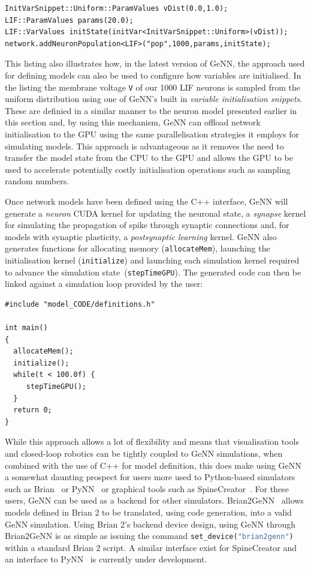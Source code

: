 \documentclass[utf8]{frontiersSCNS} %
\begin{document}
%
\begin{lstlisting}
InitVarSnippet::Uniform::ParamValues vDist(0.0,1.0);
LIF::ParamValues params(20.0);
LIF::VarValues initState(initVar<InitVarSnippet::Uniform>(vDist));
network.addNeuronPopulation<LIF>("pop",1000,params,initState);
\end{lstlisting}
%
This listing also illustrates how, in the latest version of GeNN, the approach used for defining models can also be used to configure how variables are initialised.
In the listing the membrane voltage \lstinline{V} of our \num{1000} LIF neurons is sampled from the uniform distribution using one of GeNN's built in \textit{variable initialisation snippets}.
These are definied in a similar manner to the neuron model presented earlier in this section and, by using this mechanism, GeNN can offload network initialisation to the GPU using the same parallelisation strategies it employs for simulating models.
This approach is advantageous as it removes the need to transfer the model state from the CPU to the GPU and allows the GPU to be used to accelerate potentially costly initialisation operations such as sampling random numbers.

Once network models have been defined using the C++ interface, GeNN will generate a \textit{neuron} CUDA kernel for updating the neuronal state, a \textit{synapse} kernel for simulating the propagation of spike through synaptic connections and, for models with synaptic plasticity, a \textit{postsynaptic learning} kernel. 
GeNN also generates functions for allocating memory (\lstinline{allocateMem}), launching the initialisation kernel (\lstinline{initialize}) and launching each simulation kernel required to advance the simulation state~(\lstinline{stepTimeGPU}).
The generated code can then be linked against a simulation loop provided by the user:
%
\begin{lstlisting}
#include "model_CODE/definitions.h"

int main()
{
  allocateMem();
  initialize();
  while(t < 100.0f) {
     stepTimeGPU();
  }
  return 0;
}
\end{lstlisting}
%
While this approach allows a lot of flexibility and means that visualisation tools and closed-loop robotics can be tightly coupled to GeNN simulations, when combined with the use of C++ for model definition, this does make using GeNN a somewhat daunting prospect for users more used to Python-based simulators such as Brian~\citep{Stimberg2014} or PyNN~\citep{Davison2008a} or graphical tools such as SpineCreator~\citep{Cope2017}.
For these users, GeNN can be used as a backend for other simulators.
Brian2GeNN~\citep{Stimberg2018} allows models defined in Brian 2 to be translated, using code generation, into a valid GeNN simulation. 
Using Brian 2's backend device design, using GeNN through Brian2GeNN is as simple as issuing the command \lstinline[language=python]{set_device("brian2genn")} within a standard Brian 2 script. 
A similar interface exist for SpineCreator and an interface to PyNN~\citep{Davison2008a} is currently under development.
 
\end{document}
